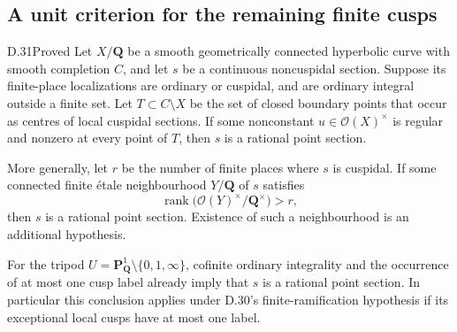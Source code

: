 \subsection{A unit criterion for the remaining finite cusps}

\begin{claim}{D.31}{Proved}\label{clm:D31}
Let $X/\mathbf Q$ be a smooth geometrically connected
hyperbolic curve with smooth completion $C$, and let $s$
be a continuous noncuspidal section. Suppose its finite-place
localizations are ordinary or cuspidal, and are ordinary
integral outside a finite set.
Let $T\subset C\setminus X$ be the set of closed boundary
points that occur as centres of local cuspidal sections.
If some nonconstant $u\in\mathcal O(X)^\times$ is regular
and nonzero at every point of $T$, then $s$ is a rational
point section.

More generally, let $r$ be the number of finite places
where $s$ is cuspidal. If some connected finite \'etale
neighbourhood $Y/\mathbf Q$ of $s$ satisfies
\[
          \operatorname{rank}
          \bigl(\mathcal O(Y)^\times/\mathbf Q^\times\bigr)>r,
\]
then $s$ is a rational point section. Existence of such a
neighbourhood is an additional hypothesis.

For the tripod
$U=\mathbf P^1_{\mathbf Q}\setminus\{0,1,\infty\}$,
cofinite ordinary integrality and the occurrence of at
most one cusp label already imply that $s$ is a rational
point section. In particular this conclusion applies
under D.30's finite-ramification hypothesis if its
exceptional local cusps have at most one label.
\end{claim}

